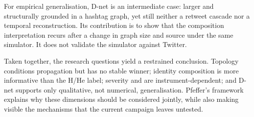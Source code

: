 For empirical generalisation, D-net is an intermediate case: larger and
structurally grounded in a hashtag graph, yet still neither a retweet cascade
nor a temporal reconstruction.  Its contribution is to show that the
composition interpretation recurs after a change in graph size and source under
the same simulator.  It does not validate the simulator against Twitter.

Taken together, the research questions yield a restrained conclusion.
Topology conditions propagation but has no stable winner; identity
composition is more informative than the H/He label; severity and \kstar{}
are instrument-dependent; and D-net supports only qualitative, not numerical,
generalisation.  Pfeffer's framework explains why these dimensions should be
considered jointly, while also making visible the mechanisms that the current
campaign leaves untested.
